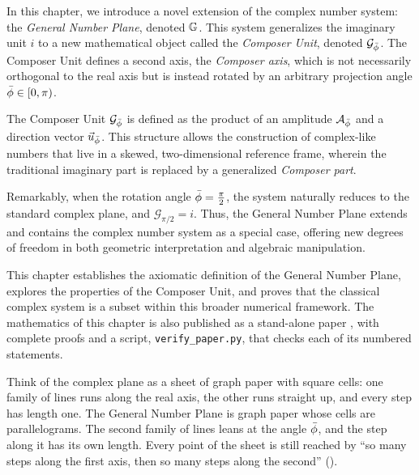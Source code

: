 In this chapter, we introduce a novel extension of the complex number system: the \emph{General Number Plane}, denoted $\mathbb{G}$. This system generalizes the imaginary unit $i$ to a new mathematical object called the \emph{Composer Unit}, denoted $\mathcal{G}_{\bar{\phi}}$. The Composer Unit defines a second axis, the \emph{Composer axis}, which is not necessarily orthogonal to the real axis but is instead rotated by an arbitrary projection angle $\bar{\phi} \in [0, \pi)$.

The Composer Unit $\mathcal{G}_{\bar{\phi}}$ is defined as the product of an amplitude $\mathcal{A}_{\bar{\phi}}$ and a direction vector $\vec{u}_{\bar{\phi}}$. This structure allows the construction of complex-like numbers that live in a skewed, two-dimensional reference frame, wherein the traditional imaginary part is replaced by a generalized \emph{Composer part}.

Remarkably, when the rotation angle $\bar{\phi} = \frac{\pi}{2}$, the system naturally reduces to the standard complex plane, and $\mathcal{G}_{\pi/2} = i$. Thus, the General Number Plane extends and contains the complex number system as a special case, offering new degrees of freedom in both geometric interpretation and algebraic manipulation.

This chapter establishes the axiomatic definition of the General Number Plane, explores the properties of the Composer Unit, and proves that the classical complex system is a subset within this broader numerical framework. The mathematics of this chapter is also published as a stand-alone paper \citep{DerrazGNPreprint2026}, with complete proofs and a script, \texttt{verify\_paper.py}, that checks each of its numbered statements.

\begin{plainwords}
Think of the complex plane as a sheet of graph paper with square cells: one family of lines runs along the real axis, the other runs straight up, and every step has length one. The General Number Plane is graph paper whose cells are parallelograms. The second family of lines leans at the angle $\bar{\phi}$, and the step along it has its own length. Every point of the sheet is still reached by ``so many steps along the first axis, then so many steps along the second'' ().
\end{plainwords}

